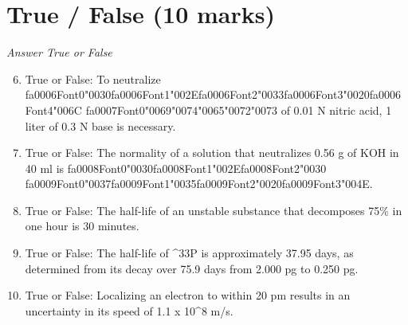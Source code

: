 \documentclass[12pt]{article}
\begin{document}
\section*{True / False (10 marks)}
\textit{Answer True or False}
\begin{enumerate}[label=\arabic*.]
\setcounter{enumi}{5}
\item True or False: To neutralize {\csname fa0006Font0\endcsname\char"0030}{\csname fa0006Font1\endcsname\char"002E}{\csname fa0006Font2\endcsname\char"0033}{\csname fa0006Font3\endcsname\char"0020}{\csname fa0006Font4\endcsname\char"006C} {\csname fa0007Font0\endcsname\char"0069}{\char"0074}{\char"0065}{\char"0072}{\char"0073} of 0.01 N nitric acid, 1 liter of 0.3 N base is necessary.
\item True or False: The normality of a solution that neutralizes 0.56 g of KOH in 40 ml is {\csname fa0008Font0\endcsname\char"0030}{\csname fa0008Font1\endcsname\char"002E}{\csname fa0008Font2\endcsname\char"0030} {\csname fa0009Font0\endcsname\char"0037}{\csname fa0009Font1\endcsname\char"0035}{\csname fa0009Font2\endcsname\char"0020}{\csname fa0009Font3\endcsname\char"004E}.
\item True or False: The half-life of an unstable substance that decomposes 75\% in one hour is 30 minutes.
\item True or False: The half-life of \^{}33P is approximately 37.95 days, as determined from its decay over 75.9 days from 2.000 pg to 0.250 pg.
\item True or False: Localizing an electron to within 20 pm results in an uncertainty in its speed of 1.1 x 10\^{}8 m/s.
\end{enumerate}
\end{document}
